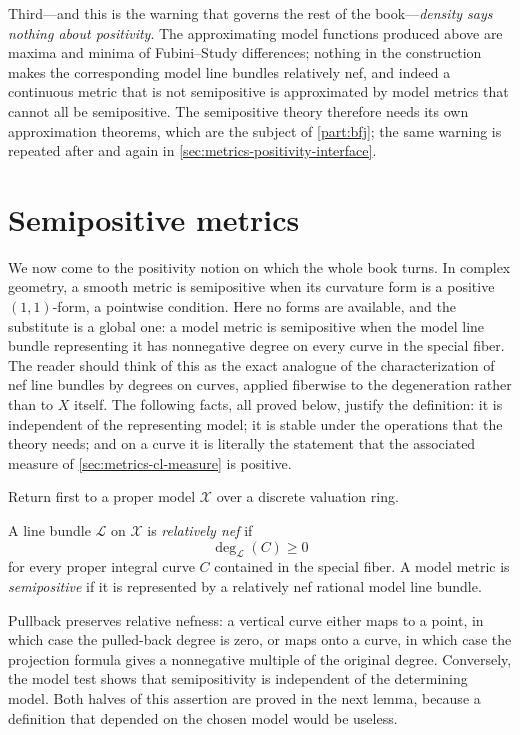 Third---and this is the warning that governs the rest of the
book---\emph{density says nothing about positivity}. The approximating model
functions produced above are maxima and minima of Fubini--Study differences;
nothing in the construction makes the corresponding model line bundles
relatively nef, and indeed a continuous metric that is not semipositive is
approximated by model metrics that cannot all be semipositive. The
semipositive theory therefore needs its own approximation theorems, which
are the subject of \cref{part:bfj}; the same warning is repeated after
 and again in
\cref{sec:metrics-positivity-interface}.

\section{Semipositive metrics}
\label{sec:metrics-semipositive}

We now come to the positivity notion on which the whole book turns. In
complex geometry, a smooth metric is semipositive when its curvature form is
a positive $(1,1)$-form, a pointwise condition. Here no forms are
available, and the substitute is a global one: a model metric is
semipositive when the model line bundle representing it has nonnegative
degree on every curve in the special fiber. The reader should think of this
as the exact analogue of the characterization of nef line bundles by degrees
on curves, applied fiberwise to the degeneration rather than to $X$
itself. The following facts, all proved below, justify the definition:
it is independent of the representing model; it is stable under the
operations that the theory needs; and on a curve it is literally the
statement that the associated measure of \cref{sec:metrics-cl-measure} is
positive.

Return first to a proper model $\mathcal X$ over a discrete valuation ring.

\begin{definition}
\label{def:metrics-model-semipositivity}
A line bundle $\mathcal L$ on $\mathcal X$ is
\emph{relatively nef} if
\[
                         \deg_{\mathcal L}(C)\geq0
\]
for every proper integral curve $C$ contained in the special fiber. A
model metric is \emph{semipositive} if it is represented by a relatively
nef rational model line bundle.
\end{definition}

Pullback preserves relative nefness: a vertical curve either maps to a
point, in which case the pulled-back degree is zero, or maps onto a curve,
in which case the projection formula gives a nonnegative multiple of the
original degree. Conversely, the model test shows that semipositivity is
independent of the determining model. Both halves of this assertion are
proved in the next lemma, because a definition that depended on the chosen
model would be useless.

